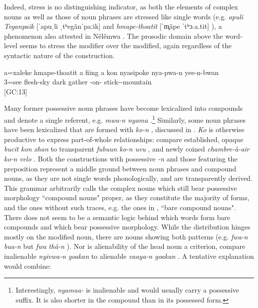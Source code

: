 Indeed, stress is no distinguishing indicator, as both the elements of complex nouns as well as those of noun phrases are stressed like single words (e.g. \textit{apuli Teganpaik} [ˈapuˌli ˌtʰegãnˈpaːik]  and \textit{hmape-thoatit} [ˈm̥ãpe ˈtʰɔ.a.tit] ), a phenomenon also attested in Nêlêmwa \parencite[204]{bril_noms_2004}. The prosodic domain above the word-level seems to stress the modifier over the modified, again regardless of the syntactic nature of the construction.

\ea \label{ex:cloud}
\gll a=xaleke {\ob\ob\ob}hmape-thoatit{\cb} a fiing{\cb} a kon nyasipoke{\cb} nya-pwa-n yee-n-bwan\\
 3=see flesh-sky  dark   gather -on- stick--mountain\\
\glt {} {[GC:13]}
\z

\begin{sloppypar}
Many former possessive noun phrases have become lexicalized into compounds and denote a single referent, e.g. \textit{mwa-n nyama} .\footnote{Interestingly, \textit{nyamaa-} is inalienable and would usually carry a possessive suffix. It is also shorter in the compound than in its possessed form.} Similarly, some noun phrases have been lexicalized that are formed with \textit{ko-n} , discussed in . \textit{Ko} is otherwise productive to express part-of-whole relationships: compare established, opaque \textit{bucit kon xhan}  to transparent \textit{fubuun ko-n uvu}  , and newly coined \textit{chambre-à-air ko-n velo}  . Both the constructions with possessive \textit{-n} and those featuring the preposition represent a middle ground between noun phrases and compound nouns, as they are not single words phonologically, and are transparently derived. This grammar arbitrarily calls the complex nouns which still bear possessive morphology ``compound nouns" proper, as they constitute the majority of forms, and the ones without such traces, e.g. the ones in , ``bare compound nouns". There does not seem to be a semantic logic behind which words form bare compounds and which bear possessive morphology. While the distribution hinges mostly on the modified noun, there are nouns showing both patterns (e.g. \textit{fwa-n bua-n}   but \textit{fwa thâ-n}  ). Nor is alienability of the head noun a criterion, compare inalienable \textit{nyivwa-n goakan}   to alienable \textit{vaaya-n goakan}  . A tentative explanation would combine:
\end{sloppypar}


